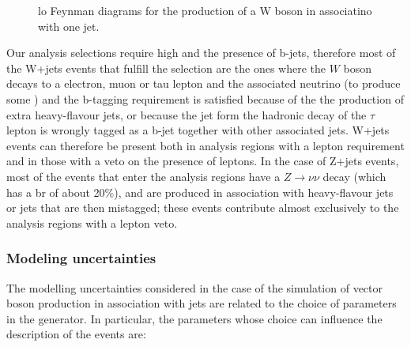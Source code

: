 \begin{figure}[h]
\centering 
{}
\caption{\gls{lo} Feynman diagrams for the production of a W boson in associatino with one jet.}\label{fig:W_prod}
\end{figure}

Our analysis selections require high \met and the presence of b-jets, therefore most of the W+jets events that fulfill the selection are the ones where the $W$ boson decays to a electron, muon or tau lepton 
and the associated neutrino (to produce some \met) and the b-tagging requirement is satisfied because of the the production of extra heavy-flavour jets, or because the jet form the hadronic decay of the $\tau$
lepton is wrongly tagged as a b-jet together with other associated jets. 
W+jets events can therefore be present both in analysis regions with a lepton requirement and in those with a veto on the presence of leptons. 
In the case of Z+jets events, most of the events that enter the analysis regions have a $Z \to \nu \nu$ decay (which has a \gls{br} of about 20\%), and are produced in association with 
heavy-flavour jets or jets that are then mistagged; these events contribute almost exclusively to the analysis regions with a lepton veto. 

\subsubsection*{Modeling uncertainties}

The modelling uncertainties considered in the case of the simulation of vector boson production in association with jets are related to the choice of parameters in the \Sherpa generator. 
In particular, the parameters whose choice can influence the description of the events are:

